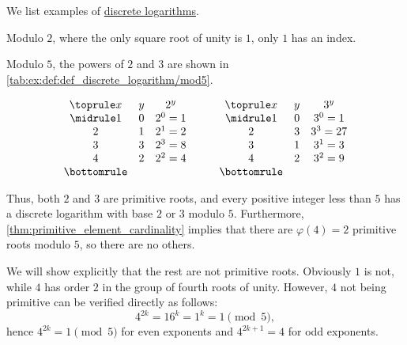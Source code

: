 \begin{example}\label{ex:def:def_discrete_logarithm}
  We list examples of \hyperref[def:discrete_logarithm]{discrete logarithms}.
  \begin{thmenum}
     Modulo \( 2 \), where the only square root of unity is \( 1 \), only \( 1 \) has an index.

     Modulo \( 5 \), the powers of \( 2 \) and \( 3 \) are shown in \cref{tab:ex:def:def_discrete_logarithm/mod5}.

    \begin{table}
      \begin{equation*}
        \begin{array}{*{3}c}
          \toprule
          x & y & 2^y \\
          \midrule
          1 & 0 & 2^0 = 1 \\
          2 & 1 & 2^1 = 2 \\
          3 & 3 & 2^3 = 8 \\
          4 & 2 & 2^2 = 4 \\
          \bottomrule
        \end{array}
        \qquad
        \begin{array}{*{3}c}
          \toprule
          x & y & 3^y \\
          \midrule
          1 & 0 & 3^0 = 1 \\
          2 & 3 & 3^3 = 27 \\
          3 & 1 & 3^1 = 3 \\
          4 & 2 & 3^2 = 9 \\
          \bottomrule
        \end{array}
      \end{equation*}
      \caption{The \hyperref[def:finite_field_index]{discrete logarithms} with bases \( 2 \) and \( 3 \) modulo \( 5 \).}\label{tab:ex:def:def_discrete_logarithm/mod5}
    \end{table}

    Thus, both \( 2 \) and \( 3 \) are primitive roots, and every positive integer less than \( 5 \) has a discrete logarithm with base \( 2 \) or \( 3 \) modulo \( 5 \). Furthermore, \cref{thm:primitive_element_cardinality} implies that there are \( \varphi(4) = 2 \) primitive roots modulo \( 5 \), so there are no others.

    We will show explicitly that the rest are not primitive roots. Obviously \( 1 \) is not, while \( 4 \) has order \( 2 \) in the group of fourth roots of unity. However, \( 4 \) not being primitive can be verified directly as follows:
    \begin{equation*}
      4^{2k} = 16^k = 1^k = 1 \pmod 5,
    \end{equation*}
    hence \( 4^{2k} = 1 \pmod 5 \) for even exponents and \( 4^{2k + 1} = 4 \) for odd exponents.


\end{thmenum}
\end{example}
